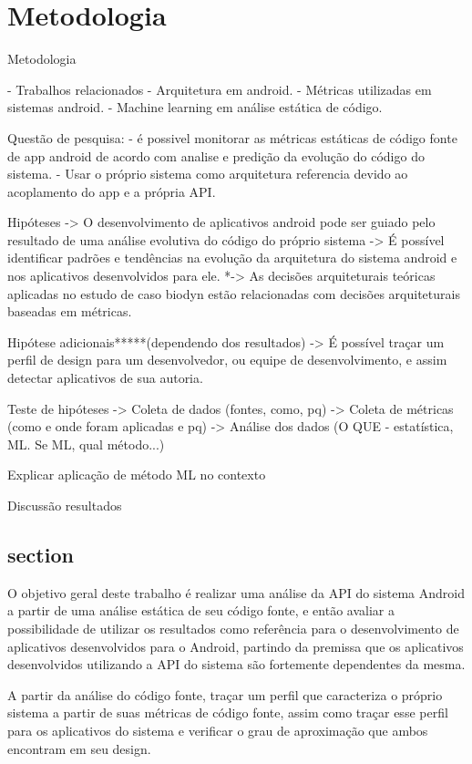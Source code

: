 \chapter{Metodologia}

Metodologia

	- Trabalhos relacionados
    - Arquitetura em android.
	- Métricas utilizadas em sistemas android.
	- Machine learning em análise estática de código.

	Questão de pesquisa: 
		- é possivel monitorar as métricas estáticas de código fonte de app android de acordo com analise e predição da evolução do código do sistema.
		- Usar o próprio sistema como arquitetura referencia devido ao acoplamento do app e a própria API.

	Hipóteses		
			-> O desenvolvimento de aplicativos android pode ser guiado pelo resultado de uma análise evolutiva do código do próprio sistema	
			-> É possível identificar padrões e tendências na evolução da arquitetura do sistema android e nos aplicativos desenvolvidos para ele.			
			*-> As decisões arquiteturais teóricas aplicadas no estudo de caso biodyn estão relacionadas com decisões arquiteturais baseadas em métricas.
			
			Hipótese adicionais*****(dependendo dos resultados)			
			-> É possível traçar um perfil de design para um desenvolvedor, ou equipe de desenvolvimento, e assim detectar aplicativos de sua autoria.

		Teste de hipóteses		
			-> Coleta de dados (fontes, como, pq)			
			-> Coleta de métricas (como e onde foram aplicadas e pq)			
			-> Análise dos dados (O QUE - estatística, ML. Se ML, qual método...)

		Explicar aplicação de método ML no contexto 

Discussão resultados

\section{section}

O objetivo geral deste trabalho é realizar uma análise da API do sistema Android a partir de uma análise estática de seu código fonte, e então avaliar a possibilidade de utilizar os resultados como referência para o desenvolvimento de aplicativos desenvolvidos para o Android, partindo da premissa que os aplicativos desenvolvidos utilizando a API do sistema são fortemente dependentes da mesma.

A partir da análise do código fonte, traçar um perfil que caracteriza o próprio sistema a partir de suas métricas de código fonte, assim como traçar esse perfil para os aplicativos do sistema e verificar o grau de aproximação que ambos encontram em seu design. 

